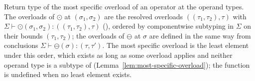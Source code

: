 Return type of the most specific overload of an operator at the operand types. The overloads of $\odot$ at $(\sigma_1, \sigma_2)$
are the resolved overloads $((\tau_1, \tau_2), \tau)$ with $\Sigma \vdash \odot(\sigma_1, \sigma_2) : ((\tau_1, \tau_2), \tau)$
(), ordered by componentwise subtyping in $\Sigma$ on their bounds $(\tau_1, \tau_2)$; the
overloads of $\ominus$ at $\sigma$ are defined in the same way from conclusions $\Sigma \vdash \ominus(\sigma) : (\tau, \tau')$.
The most specific overload is the least element under this order, which exists as long as some overload applies and
neither operand type is a subtype of  (Lemma~\ref{lem:most-specific-overload}); the function is undefined
when no least element exists.
